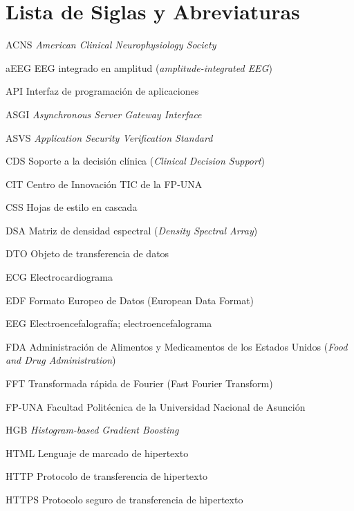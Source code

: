 
\chapter*{Lista de Siglas y Abreviaturas\hfill}

\begingroup
\begin{abbreviations}
\setlength{\itemsep}{-2pt}
\setlength{\parsep}{0pt}
\setlength{\topsep}{0pt}



    \item[ACNS] \textit{American Clinical Neurophysiology Society}
    \item[aEEG] EEG integrado en amplitud (\textit{amplitude-integrated EEG})
    \item[API] Interfaz de programación de aplicaciones
    \item[ASGI] \textit{Asynchronous Server Gateway Interface}
    \item[ASVS] \textit{Application Security Verification Standard}
    \item[CDS] Soporte a la decisión clínica (\textit{Clinical Decision Support})
    \item[CIT] Centro de Innovación TIC de la FP-UNA
    \item[CSS] Hojas de estilo en cascada
    \item[DSA] Matriz de densidad espectral (\textit{Density Spectral Array})
    \item[DTO] Objeto de transferencia de datos
    \item[ECG] Electrocardiograma
    \item[EDF] Formato Europeo de Datos (European Data Format)
    \item[EEG] Electroencefalografía; electroencefalograma
    \item[FDA] Administración de Alimentos y Medicamentos de los Estados Unidos (\textit{Food and Drug Administration})
    \item[FFT] Transformada rápida de Fourier (Fast Fourier Transform)
    \item[FP-UNA] Facultad Politécnica de la Universidad Nacional de Asunción
    \item[HGB] \textit{Histogram-based Gradient Boosting}
    \item[HTML] Lenguaje de marcado de hipertexto
    \item[HTTP] Protocolo de transferencia de hipertexto
    \item[HTTPS] Protocolo seguro de transferencia de hipertexto

\end{abbreviations}
